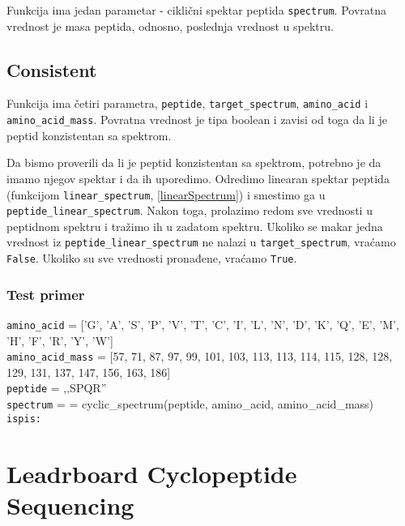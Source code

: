 Funkcija ima jedan parametar - ciklični spektar peptida \texttt{spectrum}. Povratna vrednost je masa peptida, odnosno, poslednja vrednost u spektru.



\subsection{Consistent}
\label{consistent}

Funkcija ima četiri parametra, \texttt{peptide}, \texttt{target\_spectrum}, \texttt{amino\_acid} i \texttt{amino\_acid\_mass}. Povratna vrednost je tipa boolean i zavisi od toga da li je peptid konzistentan sa spektrom.

Da bismo proverili da li je peptid konzistentan sa spektrom, potrebno je da imamo njegov spektar i da ih uporedimo. Odredimo linearan spektar peptida (funkcijom \texttt{linear\_spectrum}, \ref{linearSpectrum}) i smestimo ga u \texttt{peptide\_linear\_spectrum}. Nakon toga, prolazimo redom sve vrednosti u peptidnom spektru i tražimo ih u zadatom spektru. Ukoliko se makar jedna vrednost iz \texttt{peptide\_linear\_spectrum} ne nalazi u \texttt{target\_spectrum}, vraćamo \texttt{False}. Ukoliko su sve vrednosti pronađene, vraćamo \texttt{True}.




\subsubsection{Test primer}

\noindent\texttt{amino\_acid} = ['G', 'A', 'S', 'P', 'V', 'T', 'C', 'I', 'L', 'N', 'D', 'K', 'Q', 'E', 'M', 'H', 'F', 'R', 'Y', 'W']
\\
\texttt{amino\_acid\_mass} = [57, 71, 87, 97, 99, 101, 103, 113, 113, 114, 115, 128, 128, 129, 131, 137, 147, 156, 163, 186]
\\
\texttt{peptide} = ‚‚SPQR''
\\\texttt{spectrum} =  = cyclic\_spectrum(peptide, amino\_acid, amino\_acid\_mass)
\\\texttt{ispis:} 


\section{Leadrboard Cyclopeptide Sequencing}


